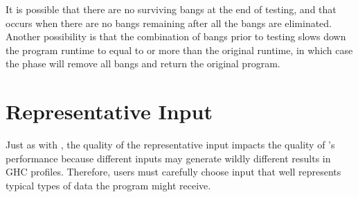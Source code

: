 It is possible that there are no surviving bangs at the end of testing, and that occurs when
there are no \hotspot{} bangs remaining after all the \coldspot{} bangs are eliminated.
Another possibility is that the combination of \hotspot{} bangs prior to testing slows down
the program runtime to equal to or more than the original runtime, in which case the \preopt{}
phase will remove all bangs and return the original program.


\section{Representative Input}

Just as with \Ao{}, the quality of the representative input impacts the quality of
\At{}'s performance because different inputs may
generate wildly different results in GHC profiles. Therefore, users
must carefully choose input that well represents typical types of data the program
might receive.
